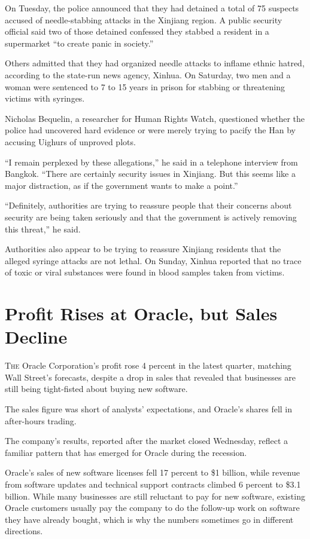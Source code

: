 ﻿\documentclass[12pt]{article}
\begin{document}
On Tuesday, the police announced that they had detained a total of 75 suspects accused of
needle-stabbing attacks in the Xinjiang region. A public security official said two of those
detained confessed they stabbed a resident in a supermarket ``to create panic in society.''

Others admitted that they had organized needle attacks to inflame ethnic hatred, according to the
state-run news agency, Xinhua. On Saturday, two men and a woman were sentenced to 7 to 15 years in
prison for stabbing or threatening victims with syringes.

Nicholas Bequelin, a researcher for Human Rights Watch, questioned whether the police had uncovered
hard evidence or were merely trying to pacify\cite{pacify} the Han by accusing Uighurs of unproved
plots.

``I remain perplexed by these allegations,'' he said in a telephone interview from Bangkok. ``There
are certainly security issues in Xinjiang. But this seems like a major distraction, as if the
government wants to make a point.''

``Definitely, authorities are trying to reassure people that their concerns about security are being
taken seriously and that the government is actively removing this threat,'' he said.

Authorities also appear to be trying to reassure Xinjiang residents that the alleged syringe attacks
are not lethal. On Sunday, Xinhua reported that no trace of toxic or viral substances were found in
blood samples taken from victims.

\section{Profit Rises at Oracle, but Sales Decline}

\lettrine{T}{he} Oracle Corporation's profit rose 4 percent in the latest quarter, matching Wall
Street's forecasts, despite a drop in sales that revealed that businesses are still being
tight-fisted about buying new software.

The sales figure was short of analysts' expectations, and Oracle's shares fell in after-hours
trading.

The company's results, reported after the market closed Wednesday, reflect a familiar pattern that
has emerged for Oracle during the recession.

Oracle's sales of new software licenses fell 17 percent to \$1 billion, while revenue from software
updates and technical support contracts climbed 6 percent to \$3.1 billion. While many businesses
are still reluctant to pay for new software, existing Oracle customers usually pay the company to do
the follow-up work on software they have already bought, which is why the numbers sometimes go in
different directions.
\end{document}
